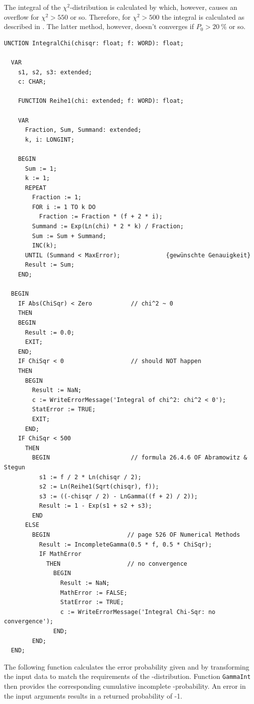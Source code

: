 \begin{refsection}
The integral of the \(\chi^2 \)-distribution is calculated by \parencite[Eqn 26.4.6]{Abr-64} which, however, causes an overflow for \(\chi^2 > 550 \) or so. Therefore, for \(\chi^2 > 500 \) the integral is calculated as described in
\parencite[p. 526]{Pre-89}. The latter method, however, doesn't converges if \(P_0 > \SI{20}{\%} \) or so.

\begin{lstlisting}[caption= \( \chi^2 \) Distribution]
  UNCTION IntegralChi(chisqr: float; f: WORD): float;

  VAR
    s1, s2, s3: extended;
    c: CHAR;

    FUNCTION Reihe1(chi: extended; f: WORD): float;

    VAR
      Fraction, Sum, Summand: extended;
      k, i: LONGINT;

    BEGIN
      Sum := 1;
      k := 1;
      REPEAT
        Fraction := 1;
        FOR i := 1 TO k DO
          Fraction := Fraction * (f + 2 * i);
        Summand := Exp(Ln(chi) * 2 * k) / Fraction;
        Sum := Sum + Summand;
        INC(k);
      UNTIL (Summand < MaxError);             {gewünschte Genauigkeit}
      Result := Sum;
    END;

  BEGIN
    IF Abs(ChiSqr) < Zero           // chi^2 ~ 0
    THEN
    BEGIN
      Result := 0.0;
      EXIT;
    END;
    IF ChiSqr < 0                   // should NOT happen
    THEN
      BEGIN
        Result := NaN;
        c := WriteErrorMessage('Integral of chi^2: chi^2 < 0');
        StatError := TRUE;
        EXIT;
      END;
    IF ChiSqr < 500
      THEN
        BEGIN                       // formula 26.4.6 OF Abramowitz & Stegun
          s1 := f / 2 * Ln(chisqr / 2);
          s2 := Ln(Reihe1(Sqrt(chisqr), f));
          s3 := ((-chisqr / 2) - LnGamma((f + 2) / 2));
          Result := 1 - Exp(s1 + s2 + s3);
        END
      ELSE
        BEGIN                      // page 526 OF Numerical Methods
          Result := IncompleteGamma(0.5 * f, 0.5 * ChiSqr);
          IF MathError
            THEN                   // no convergence
              BEGIN
                Result := NaN;
                MathError := FALSE;
                StatError := TRUE;
                c := WriteErrorMessage('Integral Chi-Sqr: no convergence');
              END;
        END;
  END;
\end{lstlisting}

The following function calculates the error probability given  and \skalar{\nu} by transforming the input data to match the requirements of the \textGamma-distribution. Function \texttt{GammaInt} then provides the corresponding cumulative incomplete \textGamma-probability. An error in the input arguments results in a returned
probability of -1.


\end{refsection}
